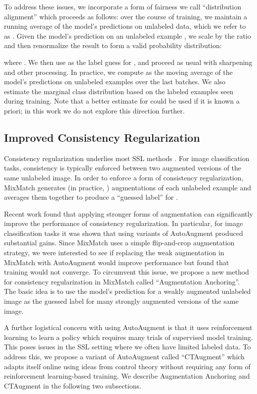\documentclass{article} \usepackage{iclr2020_conference,times}
\begin{document}
To address these issues, we incorporate a form of fairness we call ``distribution alignment'' which proceeds as follows:
over the course of training, we maintain a running average of the model's predictions on unlabeled data, which we refer to as .
Given the model's prediction  on an unlabeled example , we scale  by the ratio  and then renormalize the result to form a valid probability distribution: 

where .
We then use  as the label guess for , and proceed as usual with sharpening and other processing.
In practice, we compute  as the moving average of the model's predictions on unlabeled examples over the last  batches.
We also estimate the marginal class distribution  based on the labeled examples seen during training.
Note that a better estimate for  could be used if it is known a priori; in this work we do not explore this direction further.

\subsection{Improved Consistency Regularization}

Consistency regularization underlies most SSL methods \citep{miyato2018virtual,tarvainen2017weight,berthelot2019mixmatch,xie2019unsupervised}.
For image classification tasks, consistency is typically enforced between two augmented versions of the same unlabeled image.
In order to enforce a form of consistency regularization, MixMatch generates  (in practice, ) augmentations of each unlabeled example  and averages them together to produce a ``guessed label'' for .

Recent work \citep{xie2019unsupervised} found that applying stronger forms of augmentation can significantly improve the performance of consistency regularization.
In particular, for image classification tasks it was shown that using variants of AutoAugment \citep{cubuk2018autoaugment} produced substantial gains.
Since MixMatch uses a simple flip-and-crop augmentation strategy, we were interested to see if replacing the weak augmentation in MixMatch with AutoAugment would improve performance but found that training would not converge.
To circumvent this issue, we propose a new method for consistency regularization in MixMatch called ``Augmentation Anchoring''.
The basic idea is to use the model's prediction for a weakly augmented unlabeled image as the guessed label for many strongly augmented versions of the same image.

A further logistical concern with using AutoAugment is that it uses reinforcement learning to learn a policy which requires many trials of supervised model training.
This poses issues in the SSL setting where we often have limited labeled data.
To address this, we propose a variant of AutoAugment called ``CTAugment'' which adapts itself online using ideas from control theory without requiring any form of reinforcement learning-based training.
We describe Augmentation Anchoring and CTAugment in the following two subsections.
\end{document}
